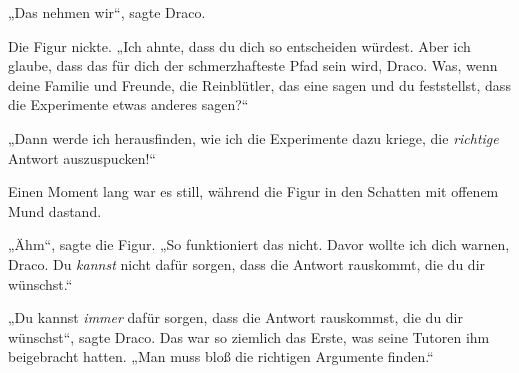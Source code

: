 „Das nehmen wir“, sagte Draco.

Die Figur nickte. „Ich ahnte, dass du dich so entscheiden würdest. Aber ich glaube, dass das für dich der schmerzhafteste Pfad sein wird, Draco. Was, wenn deine Familie und Freunde, die Reinblütler, das eine sagen und du feststellst, dass die Experimente etwas anderes sagen?“

„Dann werde ich herausfinden, wie ich die Experimente dazu kriege, die \emph{richtige} Antwort auszuspucken!“

Einen Moment lang war es still, während die Figur in den Schatten mit offenem Mund dastand.

„Ähm“, sagte die Figur. „So funktioniert das nicht. Davor wollte ich dich warnen, Draco. Du \emph{kannst} nicht dafür sorgen, dass die Antwort rauskommt, die du dir wünschst.“

„Du kannst \emph{immer} dafür sorgen, dass die Antwort rauskommst, die du dir wünschst“, sagte Draco. Das war so ziemlich das Erste, was seine Tutoren ihm beigebracht hatten. „Man muss bloß die richtigen Argumente finden.“

